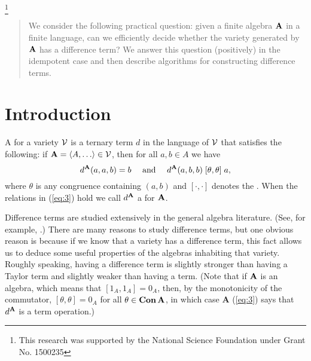 \thanks{This research was supported by the National
Science Foundation under Grant No. 1500235}

\date{\today}



\maketitle 

\begin{abstract}
We consider the following practical question: given a finite 
algebra $\mathbf{A}$ in a
finite language, can we efficiently decide whether the variety 
generated by $\mathbf{A}$
has a difference term?  We answer this question (positively) in the 
idempotent case and then describe algorithms for constructing difference 
terms.
\end{abstract}

\section{Introduction}
\label{sec:introduction}

A  for a variety $\mathcal{V}$ is a ternary term $d$ in the
language of $\mathcal{V}$ that satisfies the following:
if $\alg{A} = \<A, \dots \> \in \sV$, then for all $a, b \in A$ we have
\begin{equation}
\label{eq:3}  
d^{\mathbf{A}}(a,a,b) = b \quad \text{ and } \quad
d^{\mathbf{A}}(a,b,b) \mathrel{[\theta, \theta]} a,
\end{equation}
where $\theta$ is any congruence %
containing $(a,b)$
and $[\cdot, \cdot]$ denotes the .
When the relations in (\ref{eq:3}) hold we call $d^{\mathbf{A}}$
a  for $\mathbf{A}$.

Difference terms are studied extensively in the general algebra literature.
(See, for example, \cite{MR1358491,MR1663558,MR3076179,KSW,MR3449235}.)
There are many reasons to study difference terms, but
one obvious reason is because if we know that a variety 
has a difference term, this fact allows us to deduce some useful
properties of the algebras inhabiting that variety.
Roughly speaking, having a difference term is slightly stronger than having
a Taylor term and slightly weaker than having a \malcev term.
(Note that if
$\mathbf{A}$ is an  algebra, which means 
that $[1_A, 1_A] = 0_A$, then, by
the monotonicity of the commutator,
$[\theta, \theta] = 0_A$ for all $\theta \in \operatorname{\mathbf{Con}} \mathbf{A}$, 
in which case $\textbf{A}$
(\ref{eq:3}) says that $d^{\mathbf{A}}$ is a \malcev term operation.)

